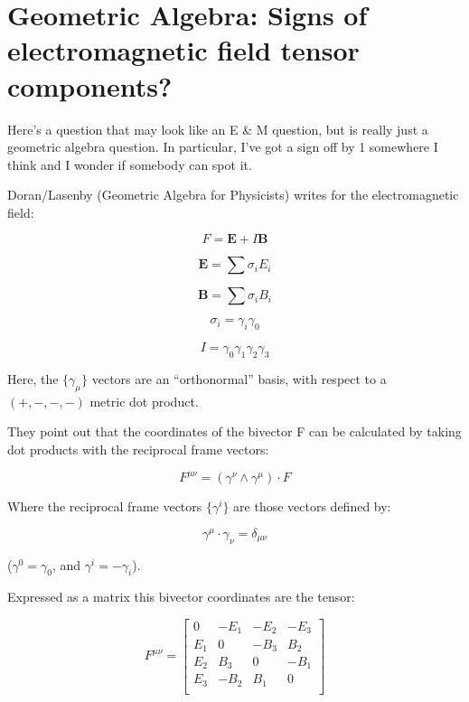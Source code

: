 \documentclass{article}      %
\title{} %
\author{Peeter Joot}         %
\begin{document}

\maketitle{}

\section{ Geometric Algebra: Signs of electromagnetic field tensor components? }

Here's a question that may look like an E \& M question, but is really just a geometric algebra question.  In particular, I've got a sign off by 1 somewhere I think and I wonder if somebody can spot it.

Doran/Lasenby (Geometric Algebra for Physicists) writes for the electromagnetic field:

\[
F = \mathbf{E} + I\mathbf{B}
\]

\[
\mathbf{E} = \sum \sigma_i E_i
\]

\[
\mathbf{B} = \sum \sigma_i B_i
\]

\[
\sigma_i = \gamma_i \gamma_0
\]

\[
I = \gamma_0 \gamma_1 \gamma_2 \gamma_3
\]

Here, the $\{\gamma_\mu\}$ vectors are an ``orthonormal'' basis, with respect to a $(+,-,-,-)$ metric dot product.

They point out that the coordinates of the bivector F can be calculated by taking dot products with the reciprocal frame vectors:

\[
F^{\mu\nu} = (\gamma^\nu \wedge \gamma^\mu) \cdot F
\]

Where the reciprocal frame vectors $\{\gamma^i\}$ are those vectors defined by:

\[
\gamma^\mu \cdot \gamma_\nu = \delta_{\mu\nu}
\]

($\gamma^0 = \gamma_0$, and $\gamma^i = -\gamma_i$).

Expressed as a matrix this bivector coordinates are the tensor:

\[
F^{\mu\nu} =
\begin{bmatrix}
0 & -E_1 & -E_2 & -E_3 \\
E_1 & 0 & -B_3 & B_2 \\
E_2 & B_3 & 0 & -B_1 \\
E_3 & -B_2 & B_1 & 0 \\
\end{bmatrix}
\]
\end{document}
